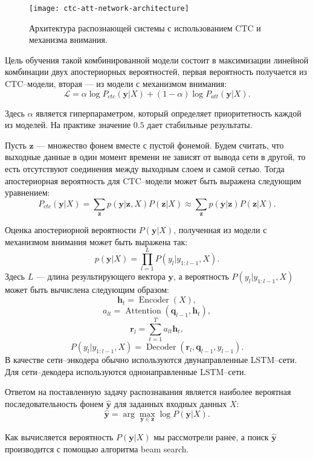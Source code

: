 \begin{figure}[h]
	\centering
	\texttt{[image: ctc-att-network-architecture]}
	\caption{Архитектура распознающей системы с использованием CTC и механизма внимания.}
	\label{fig:network-architecture}
\end{figure}

Цель обучения такой комбинированной модели состоит в максимизации линейной комбинации двух апостериорных вероятностей, первая вероятность получается из CTC--модели, вторая --- из модели с механизмом внимания:
$$\mathcal{L} = \alpha \log P_{ctc}(\mathbf{y} | X) + (1 - \alpha)\log P_{att}(\mathbf{y} | X).$$

Здесь $\alpha$ является гиперпараметром, который определяет приоритетность каждой из моделей. На практике значение $0.5$ дает стабильные результаты.

Пусть $\mathbf{z}$ --- множество фонем вместе с пустой фонемой. Будем считать, что выходные данные в один момент времени не зависят от вывода сети в другой, то есть отсутствуют соединения между выходным слоем и самой сетью. Тогда апостериорная вероятность для CTC--модели может быть выражена следующим уравнением:
$$P_{ctc}(\mathbf{y}|X) = \sum_{\mathbf{z}} p(\mathbf{y} | \mathbf{z}, X) P(\mathbf{z} | X) \approx \sum_{\mathbf{z}} p(\mathbf{y} | \mathbf{z}) P(\mathbf{z} | X).$$

Оценка апостериорной вероятности $P(\mathbf{y}|X)$, полученная из модели с механизмом внимания может быть выражена так:
$$p(\mathbf{y}|X) = \prod_{l = 1}^{L}P(y_l | y_{1:l - 1}, X).$$
Здесь $L$ --- длина результирующего вектора $\mathbf{y}$, а вероятность $P(y_l | y_{1:l - 1}, X)$ может быть вычислена следующим образом:
$$\mathbf{h}_t = \operatorname{Encoder}(X),$$
$$a_{lt} = \operatorname{Attention}(\mathbf{q}_{l - 1}, \mathbf{h}_t),$$
$$\mathbf{r}_l = \sum_{t = 1}^{T} a_{lt}\mathbf{h}_t,$$
$$P(y_l | y_{1:l - 1}, X) = \operatorname{Decoder}(\mathbf{r}_l, \mathbf{q}_{l - 1}, y_{l-1}).$$
В качестве сети--энкодера обычно используются двунаправленные LSTM--сети\cite{graves2013hybrid}. Для сети--декодера используются однонаправленные LSTM--сети.

Ответом на поставленную задачу распознавания является наиболее вероятная последовательность фонем $\hat{\mathbf{y}}$ для заданных входных данных $X$:
$$\hat{\mathbf{y}} = \arg \max_{\mathbf{y} \in \mathbf{z}} \log P(\mathbf{y} | X).$$

Как вычисляется вероятность $P(\mathbf{y}| X)$ мы рассмотрели ранее, а поиск $\hat{\mathbf{y}}$ производится с помощью алгоритма beam search\cite{wiki:Beam_search, watanabe2017hybrid}.

